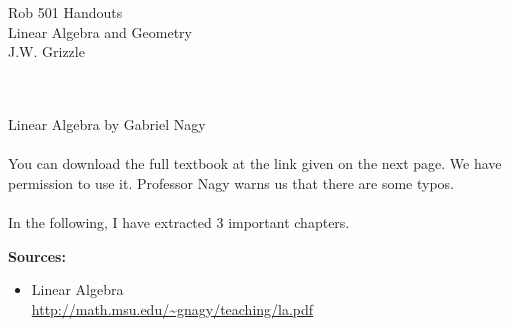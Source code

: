 \documentclass[12pt,letterpaper,headings=normal]{scrartcl}
\begin{document}


\baselineskip=48pt  %

%

\pagestyle{plain}

\vspace*{7cm}


\begin{center}
{\Large 
Rob 501 Handouts \\
Linear Algebra and Geometry
\mbox{ } \\
J.W. Grizzle \\
\mbox{ } \\
\mbox{ }
}
\end{center}



\newpage
\vspace*{10cm}
{\Large 
\begin{center}
Linear Algebra by Gabriel Nagy\\
\mbox{ } \\
 You can download the full textbook at the link given on the next page. We have permission to use it.  Professor Nagy warns us that there are some typos. \\
 \mbox{ }\\
 In the following, I have extracted 3 important chapters.
\end{center}
}
\newpage

\textbf{Sources:}
{\footnotesize
\begin{itemize}
\item Linear Algebra\\
\url{http://math.msu.edu/~gnagy/teaching/la.pdf}
\end{itemize}
}



\end{document}
